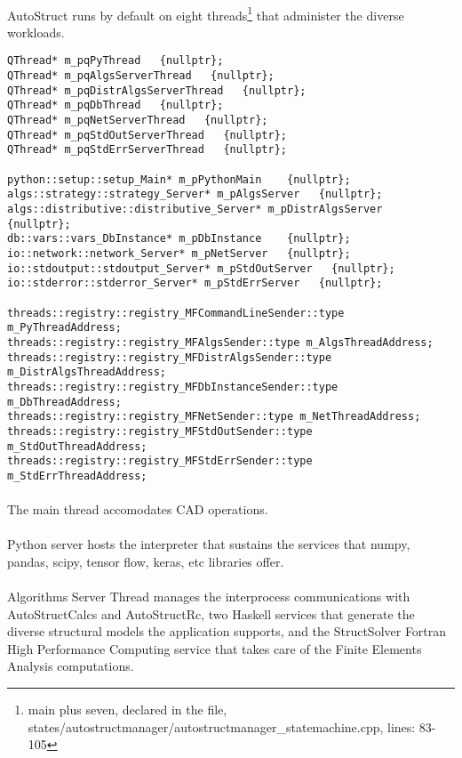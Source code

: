 \paragraph{}
AutoStruct runs by default on eight threads\footnote{main plus seven, declared in the file, states/autostructmanager/autostructmanager\_statemachine.cpp, lines: 83-105} that administer the diverse workloads.
\begin{verbatim}
QThread* m_pqPyThread   {nullptr};
QThread* m_pqAlgsServerThread   {nullptr};
QThread* m_pqDistrAlgsServerThread   {nullptr};
QThread* m_pqDbThread   {nullptr};
QThread* m_pqNetServerThread   {nullptr};
QThread* m_pqStdOutServerThread   {nullptr};
QThread* m_pqStdErrServerThread   {nullptr};

python::setup::setup_Main* m_pPythonMain    {nullptr};
algs::strategy::strategy_Server* m_pAlgsServer   {nullptr};
algs::distributive::distributive_Server* m_pDistrAlgsServer   {nullptr};
db::vars::vars_DbInstance* m_pDbInstance    {nullptr};
io::network::network_Server* m_pNetServer   {nullptr};
io::stdoutput::stdoutput_Server* m_pStdOutServer   {nullptr};
io::stderror::stderror_Server* m_pStdErrServer   {nullptr};

threads::registry::registry_MFCommandLineSender::type m_PyThreadAddress;
threads::registry::registry_MFAlgsSender::type m_AlgsThreadAddress;
threads::registry::registry_MFDistrAlgsSender::type m_DistrAlgsThreadAddress;
threads::registry::registry_MFDbInstanceSender::type m_DbThreadAddress;
threads::registry::registry_MFNetSender::type m_NetThreadAddress;
threads::registry::registry_MFStdOutSender::type m_StdOutThreadAddress;
threads::registry::registry_MFStdErrSender::type m_StdErrThreadAddress;
\end{verbatim}
\paragraph{}
The main thread accomodates CAD operations.
\paragraph{}
Python server hosts the interpreter that sustains the services that numpy, pandas, scipy, tensor flow, keras, etc libraries offer.
\paragraph{}
Algorithms Server Thread manages the interprocess communications with AutoStructCalcs and AutoStructRc, two Haskell services that generate the diverse structural models the application supports, and the StructSolver Fortran High Performance Computing service that takes care of the Finite Elements Analysis computations.
